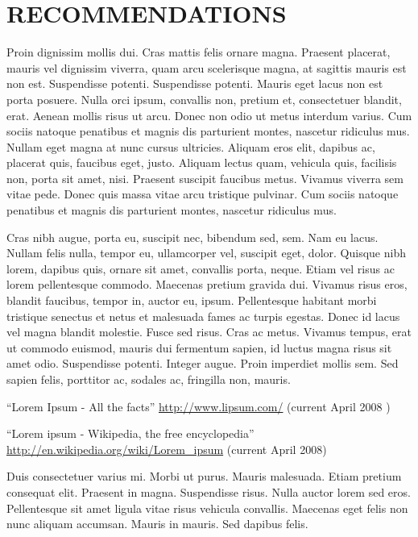 \documentclass[12pt]{article}
\begin{document}
\section{RECOMMENDATIONS}
Proin dignissim mollis dui. Cras mattis felis ornare magna. Praesent placerat, mauris vel dignissim viverra, quam arcu scelerisque magna, at sagittis mauris est non est. Suspendisse potenti. Suspendisse potenti. Mauris eget lacus non est porta posuere. Nulla orci ipsum, convallis non, pretium et, consectetuer blandit, erat. Aenean mollis risus ut arcu. Donec non odio ut metus interdum varius. Cum sociis natoque penatibus et magnis dis parturient montes, nascetur ridiculus mus. Nullam eget magna at nunc cursus ultricies. Aliquam eros elit, dapibus ac, placerat quis, faucibus eget, justo. Aliquam lectus quam, vehicula quis, facilisis non, porta sit amet, nisi. Praesent suscipit faucibus metus. Vivamus viverra sem vitae pede. Donec quis massa vitae arcu tristique pulvinar. Cum sociis natoque penatibus et magnis dis parturient montes, nascetur ridiculus mus. 

Cras nibh augue, porta eu, suscipit nec, bibendum sed, sem. Nam eu lacus. Nullam felis nulla, tempor eu, ullamcorper vel, suscipit eget, dolor. Quisque nibh lorem, dapibus quis, ornare sit amet, convallis porta, neque. Etiam vel risus ac lorem pellentesque commodo. Maecenas pretium gravida dui. Vivamus risus eros, blandit faucibus, tempor in, auctor eu, ipsum. Pellentesque habitant morbi tristique senectus et netus et malesuada fames ac turpis egestas. Donec id lacus vel magna blandit molestie. Fusce sed risus. Cras ac metus. Vivamus tempus, erat ut commodo euismod, mauris dui fermentum sapien, id luctus magna risus sit amet odio. Suspendisse potenti. Integer augue. Proin imperdiet mollis sem. Sed sapien felis, porttitor ac, sodales ac, fringilla non, mauris. 


\newpage
{}
\begin{thebibliography}{9}


``Lorem Ipsum - All the facts'' \url{http://www.lipsum.com/} (current April 2008 )

``Lorem ipsum - Wikipedia, the free encyclopedia'' \url{http://en.wikipedia.org/wiki/Lorem_ipsum} (current April 2008)

\end{thebibliography}
\newpage

Duis consectetuer varius mi. Morbi ut purus. Mauris malesuada. Etiam pretium consequat elit. Praesent in magna. Suspendisse risus. Nulla auctor lorem sed eros. Pellentesque sit amet ligula vitae risus vehicula convallis. Maecenas eget felis non nunc aliquam accumsan. Mauris in mauris. Sed dapibus felis.
\end{document}
